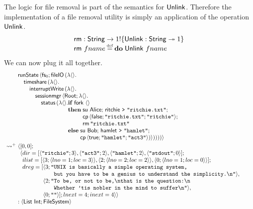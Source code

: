 \documentclass[12pt,phd,lfcs,twoside,openright,logo,leftchapter,normalheadings]{infthesis}
\theoremstyle{plain}
\theoremstyle{definition}
\begin{document}
The logic for file removal is part of the semantics for
$\mathsf{Unlink}$. Therefore the implementation of a file removal utility is
simply an application of the operation $\mathsf{Unlink}$.
%
\[
  \bl
    \dec{rm} : \String \to \UnitType \eff \{\UUnlink : \String \opto \UnitType\}\\
    \dec{rm}~fname \defas \Do\;\UUnlink~fname
  \el
\]
%
We can now plug it all together.
%
\[
  \ba{@{~}l@{~}l}
    &\bl
    \runState\,\Record{\dec{fs}_0;\fileIO\,(\lambda\Unit.\\
         \quad\timeshare\,(\lambda\Unit.\\
         \qquad\dec{interruptWrite}\,(\lambda\Unit.\\
         \qquad\quad\sessionmgr\,\Record{\Root;\lambda\Unit.\\
         \qquad\qquad\status\,(\lambda\Unit.
                 \ba[t]{@{}l}
                   \If\;\fork~\Unit\;\\
                   \Then\;
                     \bl
                       \su~\Alice;\,
                       \quoteRitchie~\redirect~\strlit{ritchie.txt};\\
                       \dec{cp}\,\Record{\False;\strlit{ritchie.txt};\strlit{ritchie}};\\
                       \dec{rm}\,\strlit{ritchie.txt}
                     \el\\
                   \Else\;
                     \bl
                       \su~\Bob;\,
                       \quoteHamlet~\redirect~\strlit{hamlet};\\
                       \dec{cp}\,\Record{\True;\strlit{hamlet};\strlit{act3}}
                       )}))))}
                     \el
                 \ea
     \el \smallskip\\
     \reducesto^+&
     \bl
      \Record{
       \ba[t]{@{}l}
       [0, 0];\\
       \Record{
         \ba[t]{@{}l}
           dir=[\Record{\strlit{ritchie};3},\Record{\strlit{act3};2},\Record{\strlit{hamlet};2},
                \Record{\strlit{stdout};0}];\\
           ilist=[\Record{3;\Record{lno=1;loc=3}},
                  \Record{2;\Record{lno=2;loc=2}},
                  \Record{0;\Record{lno=1;loc=0}}];\\
           dreg=[
             \ba[t]{@{}l}
               \Record{3;
                 \ba[t]{@{}l@{}l}
                   \texttt{"}&\texttt{UNIX is basically a simple operating system, }\\
                             &\texttt{but you have to be a genius to understand the simplicity.\nl{"}}},
                 \ea\\
               \Record{2;
                 \ba[t]{@{}l@{}l}
                   \texttt{"}&\texttt{To be, or not to be,\nl{}that is the question:\nl{}}\\
                             &\texttt{Whether 'tis nobler in the mind to suffer\nl{}"}},
                 \ea\\
                 \Record{0; \strlit{}}]; lnext=4; inext=4}}\\
           \ea
         \ea
       \ea\\
       : \Record{\List~\Int; \FileSystem}
     \el
  \ea
\]
\end{document}
